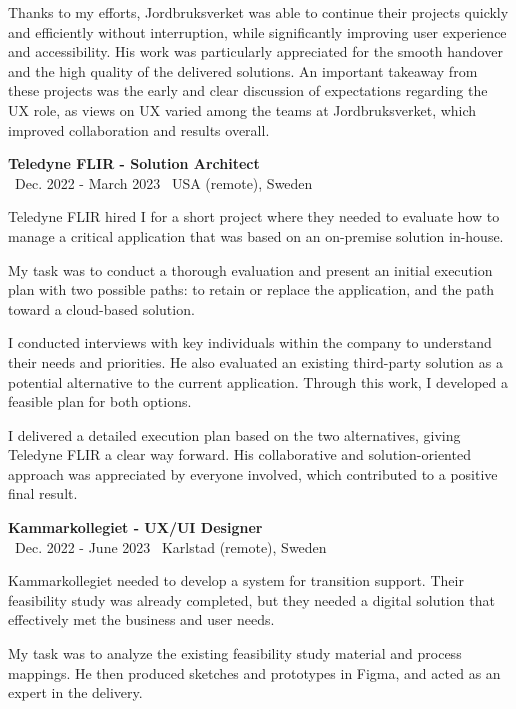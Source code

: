 \documentclass[a4paper,10pt]{article}
\begin{document}
Thanks to my efforts, Jordbruksverket was able to continue their projects quickly and efficiently without interruption, while significantly improving user experience and accessibility. His work was particularly appreciated for the smooth handover and the high quality of the delivered solutions. An important takeaway from these projects was the early and clear discussion of expectations regarding the UX role, as views on UX varied among the teams at Jordbruksverket, which improved collaboration and results overall.

\vspace{0.5cm}
\textbf{Teledyne FLIR - Solution Architect}\\
\normalsize \faCalendar \ Dec. 2022 - March 2023 \quad \faMapMarker \ USA (remote), Sweden

Teledyne FLIR hired I for a short project where they needed to evaluate how to manage a critical application that was based on an on-premise solution in-house.

My task was to conduct a thorough evaluation and present an initial execution plan with two possible paths: to retain or replace the application, and the path toward a cloud-based solution.

I conducted interviews with key individuals within the company to understand their needs and priorities. He also evaluated an existing third-party solution as a potential alternative to the current application. Through this work, I developed a feasible plan for both options.

I delivered a detailed execution plan based on the two alternatives, giving Teledyne FLIR a clear way forward. His collaborative and solution-oriented approach was appreciated by everyone involved, which contributed to a positive final result.

\vspace{0.5cm}
\textbf{Kammarkollegiet - UX/UI Designer}\\
\normalsize \faCalendar \ Dec. 2022 - June 2023 \quad \faMapMarker \ Karlstad (remote), Sweden

Kammarkollegiet needed to develop a system for transition support. Their feasibility study was already completed, but they needed a digital solution that effectively met the business and user needs.

My task was to analyze the existing feasibility study material and process mappings. He then produced sketches and prototypes in Figma, and acted as an expert in the delivery.
\end{document}
